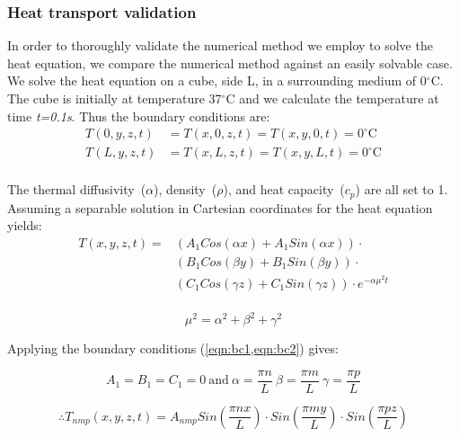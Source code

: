 \subsubsection{Heat transport validation}

In order to thoroughly validate the numerical method we employ to solve the heat equation, we compare the numerical method against an easily solvable case. We solve the heat equation on a cube, side L, in a surrounding medium of 0$^{\circ}$C. The cube is initially at temperature 37$^{\circ}$C and we calculate the temperature at time \textit{t=0.1s}. Thus the boundary conditions are:\\

\begin{align}
T(0,y,z,t)&=T(x,0,z,t)=T(x,y,0,t)=0^{\circ}\text{C} \label{eqn:bc1}\\
T(L,y,z,t)&=T(x,L,z,t)=T(x,y,L,t)=0^{\circ}\text{C} \label{eqn:bc2}\\
\end{align}

The thermal diffusivity~($\alpha$), density~($\rho$), and heat capacity~($c_p$) are all set to 1.\\


Assuming a separable solution in Cartesian coordinates for the heat equation yields:
\begin{equation}
\begin{split}
T(x,y,z,t)=&(A_1Cos(\alpha x) + A_1Sin(\alpha x))\cdot\\
&(B_1Cos(\beta y) + B_1Sin(\beta y))\cdot\\
&(C_1Cos(\gamma z) + C_1Sin(\gamma z))\cdot e^{-\alpha\mu^2t}\\
\end{split} 
\end{equation}

\begin{equation}
\mu^2=\alpha^2+\beta^2+\gamma^2
\end{equation}

Applying the boundary conditions (\cref{eqn:bc1,eqn:bc2}) gives:

\begin{equation}
A_1=B_1=C_1=0\
\text{and}\ \alpha=\frac{\pi n}{L}\ \beta=\frac{\pi m}{L}\ \gamma=\frac{\pi p}{L}
\end{equation}

\begin{equation}
\therefore  T_{nmp}(x,y,z,t)=A_{nmp}Sin\left(\frac{\pi n x}{L}\right)\cdot Sin\left(\frac{\pi m y}{L}\right)\cdot Sin\left(\frac{\pi p z}{L}\right)
\end{equation}

